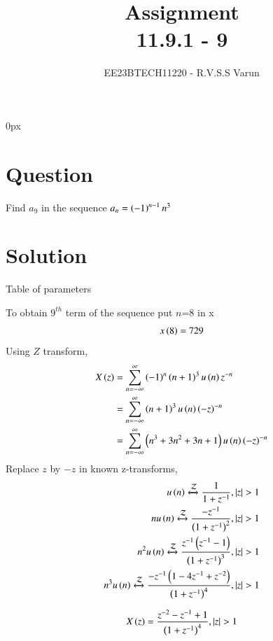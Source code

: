 \documentclass[beamer]{IEEEtran}
\theoremstyle{remark}
\begin{document}
\parindent 0px


\title{Assignment\\[1ex]11.9.1 - 9}
\author{EE23BTECH11220 - R.V.S.S Varun$^{}$%
}
\maketitle
\newpage
\bigskip

\renewcommand{\thefigure}{\theenumi}
\renewcommand{\thetable}{\theenumi}
\section*{Question}
Find $a_{9}$ in the sequence $a_{n}=\left(-1\right)^{n-1}n^{3}$ 
\section*{Solution}
 
\begin{table}[h]
    \centering
   
    
    \caption{Table of parameters}
    \label{tab:11.9.1.9.1}
\end{table}


To obtain $9^{th}$ term of the sequence put $n$=8 in x
\begin{align}
x\left(8\right)=729
\end{align}
Using $Z$ transform,
\begin{align}
	X\left(z\right)&=\sum_{n=-\infty}^{\infty}\left(-1\right)^n\left(n+1\right)^3u\left(n\right)z^{-n}\\
	&=\sum_{n=-\infty}^{\infty}\left(n+1\right)^3u\left(n\right)\left(-z\right)^{-n}\\
	&=\sum_{n=-\infty}^{\infty}\left(n^3+3n^2+3n+1\right)u\left(n\right)\left(-z\right)^{-n}
\end{align}
Replace $z$ by $-z$ in known z-transforms,
\begin{align}
	u\left(n\right)\xleftrightarrow{\mathcal{Z}}\frac{1}{1+z^{-1}},\left\vert z\right\vert>1\\
	nu\left(n\right)\xleftrightarrow{\mathcal{Z}}\frac{-z^{-1}}{\left(1+z^{-1}\right)^2},\left\vert z\right\vert>1\\
	n^2u\left(n\right)\xleftrightarrow{\mathcal{Z}}\frac{z^{-1}\left(z^{-1}-1\right)}{\left(1+z^{-1}\right)^3},\left\vert z\right\vert>1\\
	n^3u\left(n\right)\xleftrightarrow{\mathcal{Z}}\frac{-z^{-1}\left(1-4z^{-1}+z^{-2}\right)}{\left(1+z^{-1}\right)^4},\left\vert z\right\vert>1
\end{align}

\begin{align}
	X\left(z\right)=\frac{z^{-2}-z^{-1}+1}{\left(1+z^{-1}\right)^4},\left\vert z\right\vert>1
\end{align}
\end{document}
